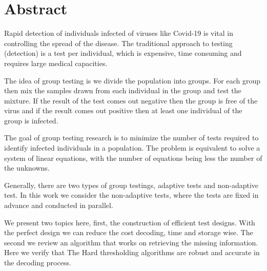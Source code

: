 \chapter*{Abstract}
%
%



Rapid detection of individuals infected of viruses like Covid-19 is vital in controlling the spread of the disease. The traditional approach to testing (detection) is a test per individual, which is expensive, time consuming and requires large medical capacities.  

The idea of group testing is we divide the population into groups. For each group then mix the samples drawn from each individual in the group and test the mixture. If the result of the test comes out negative then the group is free of the virus and if the result comes out positive then at least one individual of the group is infected. 


The goal of group testing research is to minimize the number of tests required to identify infected individuals in a population.  The problem is equivalent to solve a system of linear equations, with the number of equations being less the number of the unknowns.  


Generally, there are two types of group testings, adaptive tests and non-adaptive test. In this work we consider the non-adaptive tests, where the tests are fixed in advance and conducted in parallel.


We present two topics here, first, the construction of efficient test designs. With the perfect design we can reduce the cost decoding, time and storage wise.  The second we review an algorithm that works on retrieving the missing information.  Here we verify that The Hard thresholding algorithms are robust and accurate in the decoding process.  
